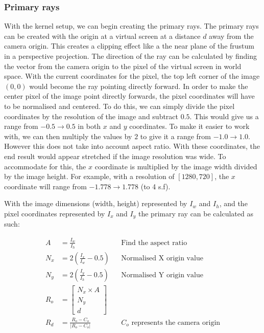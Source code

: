 \documentclass[final]{cmpreport}
\begin{document}
\subsubsection{Primary rays}
With the kernel setup, we can begin creating the primary rays. The primary rays can be created with the origin at a virtual screen at a distance \(d\) away from the camera origin. This creates a clipping effect like a the near plane of the frustum in a perspective projection. The direction of the ray can be calculated by finding the vector from the camera origin to the pixel of the virtual screen in world space. With the current coordinates for the pixel, the top left corner of the image \((0, 0)\) would become the ray pointing directly forward. In order to make the center pixel of the image point directly forwards, the pixel coordinates will have to be normalised and centered. To do this, we can simply divide the pixel coordinates by the resolution of the image and subtract \(0.5\). This would give us a range from \(-0.5 \rightarrow 0.5\) in both \(x\) and \(y\) coordinates. To make it easier to work with, we can then multiply the values by \(2\) to give it a range from \(-1.0 \rightarrow 1.0\). However this does not take into account aspect ratio. With these coordinates, the end result would appear stretched if the image resolution was wide. To accommodate for this, the \(x\) coordinate is multiplied by the image width divided by the image height. For example, with a resolution of \([1280, 720]\), the \(x\) coordinate will range from \(-1.778 \rightarrow 1.778\) (to 4 s.f).

With the image dimensions (width, height) represented by \(I_w\) and \(I_h\), and the pixel coordinates represented by \(I_x\) and \(I_y\) the primary ray can be calculated as such:

\begin{align}
    A &= \frac{I_w}{I_h} && \text{Find the aspect ratio} \\
    N_x &= 2(\frac{I_x}{I_w} - 0.5) && \text{Normalised X origin value} \\
    N_y &= 2(\frac{I_y}{I_h} - 0.5) && \text{Normalised Y origin value} \\
    R_o &=
    \begin{bmatrix}
        N_x \times A \\
        N_y \\
        d
    \end{bmatrix} \\
    R_d &= \frac{R_o - C_o}{|R_o - C_o|} && C_o \text{ represents the camera origin}
\end{align}
\end{document}

